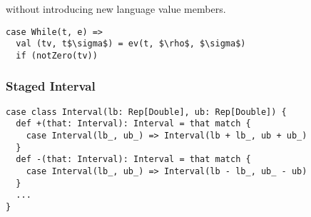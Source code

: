 without introducing new language value members.

\begin{lstlisting}
case While(t, e) =>
  val (tv, t$\sigma$) = ev(t, $\rho$, $\sigma$)
  if (notZero(tv)) 
\end{lstlisting}

\subsubsection{Staged Interval}

\begin{lstlisting}
case class Interval(lb: Rep[Double], ub: Rep[Double]) {
  def +(that: Interval): Interval = that match {
    case Interval(lb_, ub_) => Interval(lb + lb_, ub + ub_)
  }
  def -(that: Interval): Interval = that match {
    case Interval(lb_, ub_) => Interval(lb - lb_, ub_ - ub) 
  }
  ...
}
\end{lstlisting}

